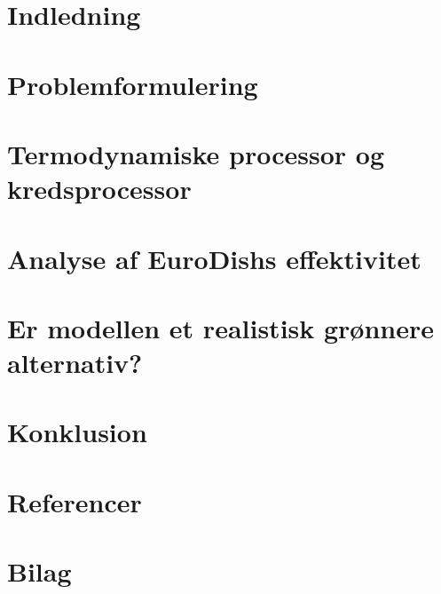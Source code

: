 \documentclass[12pt,a4paper]{article}
\author{Christian Kaae Larsen}
\begin{document}
	
	
	
	
	\newpage
	
	
	
	\tableofcontents
	
	\newpage
	
	\section{Indledning}
	

	\section{Problemformulering}
	
	
	
	\section{Termodynamiske processor og kredsprocessor}
	
	
	\section{Analyse af EuroDishs effektivitet}
	
	
	\section{Er modellen et realistisk grønnere alternativ?}
	
	
	\section{Konklusion}
	
	
	\section{Referencer}
	
		
	\newpage
		
	\section{Bilag}
	
	
	
	
			
			
			
			
			
			
\end{document}
